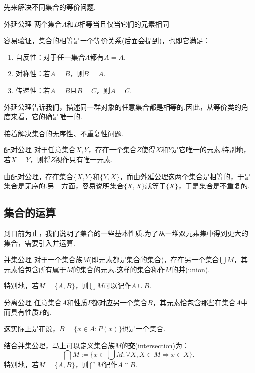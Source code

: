 \documentclass[lang=cn, zihao=5]{elegantbook}
\begin{document}
先来解决不同集合的等价问题.

\begin{axiom}{外延公理}
	两个集合$A$和$B$相等当且仅当它们的元素相同.
\end{axiom}

容易验证，集合的相等是一个等价关系(后面会提到)，也即它满足：
\begin{enumerate}
	\item 自反性：对于任一集合$A$都有$A=A$.
	\item 对称性：若$A=B$，则$B=A$.
	\item 传递性：若$A=B$且$B=C$，则$A=C$.
\end{enumerate}

外延公理告诉我们，描述同一群对象的任意集合都是相等的.因此，从等价类的角度来看，它的确是唯一的.

接着解决集合的无序性、不重复性问题.

\begin{axiom}{配对公理}
	对于任意集合$X,Y$，存在一个集合$Z$使得$X$和$Y$是它唯一的元素.特别地，若$X=Y$，则将$Z$视作只有唯一元素.
\end{axiom}

由配对公理，存在集合$\{ X,Y \}$和$\{ Y,X \}$，而由外延公理这两个集合是相等的，于是集合是无序的.另一方面，容易说明集合$\{ X,X \}$就等于$\{ X \}$，于是集合是不重复的.

\subsection{集合的运算}

到目前为止，我们说明了集合的一些基本性质.为了从一堆双元素集中得到更大的集合，需要引入并运算.

\begin{axiom}{并集公理}
	对于一个集合族$M$(即元素都是集合的集合)，存在另一个集合$\bigcup M$，其元素恰包含所有属于$M$的集合的元素.这样的集合称作$M$的\textbf{并}(union).
\end{axiom}

特别地，若$M=\{ A,B \}$，则$\bigcup M$可以记作$A \cup B$.

\begin{axiom}{分离公理}
	任意集合$A$和性质$P$都对应另一个集合$B$，其元素恰包含那些在集合$A$中而具有性质$P$的.
\end{axiom}

这实际上是在说，$B=\{ x \in A : P(x) \}$也是一个集合.

结合并集公理，马上可以定义集合族$M$的\textbf{交}(intersection)为：$$\bigcap M := \{ x \in \bigcup M : \forall X,X \in M \Rightarrow x \in X \}.$$
特别地，若$M= \{ A,B \}$，则$\bigcap M$记作$A \cap B$.
\end{document}

